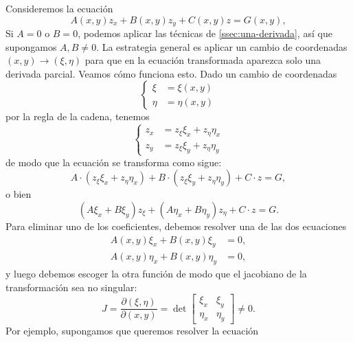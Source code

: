 \documentclass[11pt,letterpaper,draft]{report}
\theoremstyle{plain}
\theoremstyle{definition}
\theoremstyle{remark}
\newcommand\<{\langle}
\renewcommand\>{\rangle}
\begin{document}
Consideremos la ecuación
\begin{equation}
  A(x,y) z_x + B(x,y) z_y + C(x,y) z = G(x,y),
\end{equation}
Si \(A=0\) o \(B=0\), podemos aplicar las técnicas de
\ref{ssec:una-derivada}, así que supongamos \(A,B\neq 0\).
La estrategia general es aplicar un cambio de coordenadas
\((x,y)\to(\xi,\eta)\) para que en la ecuación transformada aparezca
solo una derivada parcial.
Veamos cómo funciona esto. Dado un cambio de coordenadas
\begin{equation}
  \left\{
    \begin{aligned}
      \xi &= \xi(x,y)
      \\
      \eta &= \eta(x,y)
    \end{aligned}
  \right.
\end{equation}
por la regla de la cadena, tenemos
\begin{equation}
  \left\{
    \begin{aligned}
      z_x &= z_\xi \xi_x + z_\eta \eta_x
      \\
      z_y &= z_\xi \xi_y + z_\eta \eta_y
    \end{aligned}
  \right.
\end{equation}
de modo que la ecuación se transforma como sigue:
\begin{equation}
  A \cdot (z_\xi \xi_x + z_\eta \eta_x)
  + B \cdot (z_\xi \xi_y + z_\eta \eta_y)
  + C \cdot z
  = G,
\end{equation}
o bien
\begin{equation}
  \label{eq:transformada-prev}
  (A\xi_x + B\xi_y)z_\xi 
  + (A\eta_x + B\eta_y)z_\eta 
  + C\cdot  z
  = G.
\end{equation}
Para eliminar uno de los coeficientes,
debemos resolver una de las dos ecuaciones
\begin{align}
  A(x,y)\xi_x + B(x,y)\xi_y &= 0,
  \\
  \label{eq:cond-eta}
  A(x,y)\eta_x + B(x,y)\eta_y &= 0,
\end{align}
y luego debemos escoger la otra función de modo
que el jacobiano de la transformación sea no singular:
\begin{equation}
  \label{eq:jacobiano}
  J
  =
  \frac{\partial(\xi, \eta)}{\partial(x,y)}
  = \det
  \begin{bmatrix}
    \xi_x & \xi_y \\ \eta_x & \eta_y
  \end{bmatrix}
  \neq 0.
\end{equation}
Por ejemplo, supongamos que queremos resolver la ecuación
\end{document}
